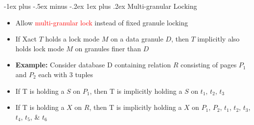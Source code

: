 \documentclass[10pt,landscape]{article}
\makeatletter
\newcommand{\subsubsubsection}{\@startsection{subsubsection}{3}{0mm}%
                                {-1ex plus -.5ex minus -.2ex}%
                                {1ex plus .2ex}%
                                {\normalfont\scriptsize\bfseries}}
\newcommand{\1}{\mathmybb{1}}
\makeatother
\begin{document}
\begin{multicols*}{3}
\subsubsubsection{Multi-granular Locking}
\begin{itemize}
    \item Allow \textcolor{red}{multi-granular lock} instead of fixed granule locking
    \item If Xact $T$ holds a lock mode $M$ on a data granule $D$, then $T$ implicitly also holds lock mode $M$ on granules finer than $D$
    \item \textbf{Example:} Consider database D containing relation $R$ consisting of pages $P_1$ and $P_2$ each with 3 tuples
\end{itemize}

\begin{multicols}{2}
    \columnbreak
    \begin{itemize}
        \item If T is holding a $S$ on $P_1$, then T is implicitly holding a $S$ on $t_1$, $t_2$, $t_3$
        \item If T is holding a $X$ on $R$, then T is implicitly holding a $X$ on $P_1$, $P_2$, $t_1$, $t_2$, $t_3$, $t_4$, $t_5$, \& $t_6$
    \end{itemize}
\end{multicols}


\end{multicols*}
\end{document}
